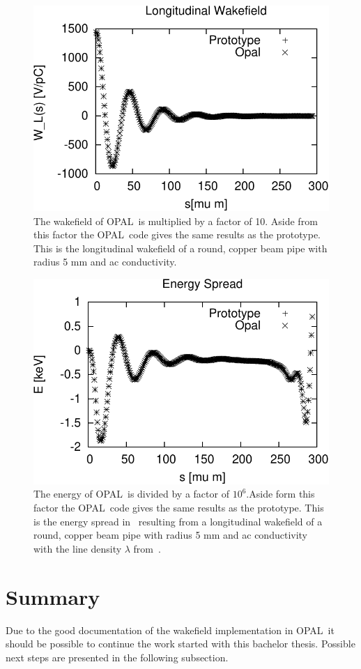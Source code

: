 \documentclass[11pt,a4paper]{article}
\newcommand{\opal}{\textsc{OPAL}}
\begin{document}
\begin{figure}[htb]
\begin{center}
\includegraphics[width=.6\textwidth]{wakeCompare/wake_Lo_Circ_Cu_AC_5_OpalNew.pdf}
\caption{The wakefield of \opal\ is multiplied by a factor of 10. Aside from this factor the \opal\ code gives the same results as the prototype. This is the longitudinal wakefield of a round, copper beam pipe with radius 5 mm and ac conductivity.
\label{fig:wakeOPAL_SI} }
\end{center}
\end{figure}

\begin{figure}[htb]
\begin{center}
\includegraphics[width=.6\textwidth]{wakeCompare/energy_Lo_Circ_Cu_AC_5_OpalNew.pdf}
\caption{The energy of \opal\ is divided by a factor of $10^6$.Aside form this factor the \opal\ code gives the same results as the prototype. This is the energy spread in~\cite{notebook} resulting from a longitudinal wakefield of a round, copper beam pipe with radius 5 mm and ac conductivity with the line density $\lambda$ from~\cite{notebook}.
\label{fig:energyOPAL_SI} }
\end{center}
\end{figure}



\clearpage
\section{Summary}
Due to the good documentation of the wakefield implementation in \opal\ 
it should be possible to continue the work started with this bachelor
thesis. Possible next steps are presented in the following subsection.
\end{document}
